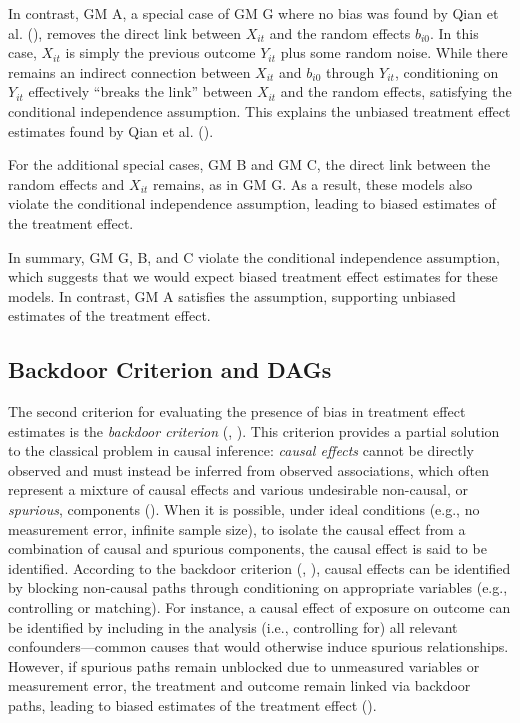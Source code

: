 \documentclass[
  11pt,
  a4paper,
]{article}
\begin{document}
In contrast, GM A, a special case of GM G where no bias was found by
Qian et al. (), removes the direct link
between \(X_{it}\) and the random effects \(b_{i0}\). In this case,
\(X_{it}\) is simply the previous outcome \(Y_{it}\) plus some random
noise. While there remains an indirect connection between \(X_{it}\) and
\(b_{i0}\) through \(Y_{it}\), conditioning on \(Y_{it}\) effectively
``breaks the link'' between \(X_{it}\) and the random effects,
satisfying the conditional independence assumption. This explains the
unbiased treatment effect estimates found by Qian et al.
().

For the additional special cases, GM B and GM C, the direct link between
the random effects and \(X_{it}\) remains, as in GM G. As a result,
these models also violate the conditional independence assumption,
leading to biased estimates of the treatment effect.

In summary, GM G, B, and C violate the conditional independence
assumption, which suggests that we would expect biased treatment effect
estimates for these models. In contrast, GM A satisfies the assumption,
supporting unbiased estimates of the treatment effect.

\subsection{Backdoor Criterion and
DAGs}\label{backdoor-criterion-and-dags}

The second criterion for evaluating the presence of bias in treatment
effect estimates is the \emph{backdoor criterion}
(, ).
This criterion provides a partial solution to the classical problem in
causal inference: \emph{causal effects} cannot be directly observed and
must instead be inferred from observed associations, which often
represent a mixture of causal effects and various undesirable
non-causal, or \emph{spurious}, components
(). When it is possible, under
ideal conditions (e.g., no measurement error, infinite sample size), to
isolate the causal effect from a combination of causal and spurious
components, the causal effect is said to be identified. According to the
backdoor criterion (,
), causal effects can be identified by
blocking non-causal paths through conditioning on appropriate variables
(e.g., controlling or matching). For instance, a causal effect of
exposure on outcome can be identified by including in the analysis
(i.e., controlling for) all relevant confounders---common causes that
would otherwise induce spurious relationships. However, if spurious
paths remain unblocked due to unmeasured variables or measurement error,
the treatment and outcome remain linked via backdoor paths, leading to
biased estimates of the treatment effect ().
\end{document}
